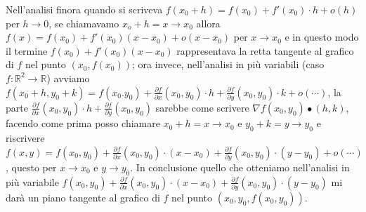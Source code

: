 Nell'analisi finora quando si scriveva $f(x_0 + h) = f(x_0) + f'(x_0) \cdot h + o(h)$ per $h\to 0$, se chiamavamo $x_o + h = x \to x_0$ allora $f(x) = f(x_0) + f'(x_0)(x - x_0) + o(x - x_0)$ per $x \to x_0$ e in questo modo il termine $f(x_0) + f'(x_0)(x - x_0)$ rappresentava la retta tangente al grafico di $f$ nel punto $(x_0, f(x_0))$; ora invece, nell'analisi in più variabili (caso $f: \mathbb{R}^2 \to \mathbb{R}$) avviamo $f(x_0 + h, y_0 + k) = f(x_0. y_0) + \frac{\partial f}{\partial x}(x_0,y_0) \cdot h + \frac{\partial f}{\partial y}(x_0, y_0) \cdot k + o(\cdots)$, la parte $\frac{\partial f}{\partial x}(x_0,y_0) \cdot h + \frac{\partial f}{\partial y}(x_0, y_0)$ sarebbe come scrivere $\nabla f(x_0, y_0) \bullet (h,k)$, facendo come prima posso chiamare $x_0  + h = x \to x_0$ e $y_0 + k = y \to y_0$ e riscrivere $f(x,y) = f(x_0, y_0) + \frac{\partial f}{\partial x}(x_0,y_0)\cdot (x - x_0) + \frac{\partial f}{\partial y} (x_0, y_0) \cdot (y - y_0) + o(\cdots)$, questo per $x \to x_0$ e $y \to y_0$. In conclusione quello che otteniamo nell'analisi in più variabile $f(x_0, y_0) + \frac{\partial f}{\partial x}(x_0,y_0)\cdot (x - x_0) + \frac{\partial f}{\partial y} (x_0, y_0) \cdot (y - y_0)$ mi darà un piano tangente al grafico di $f$ nel punto $(x_0, y_0, f(x_0,y_0))$.

